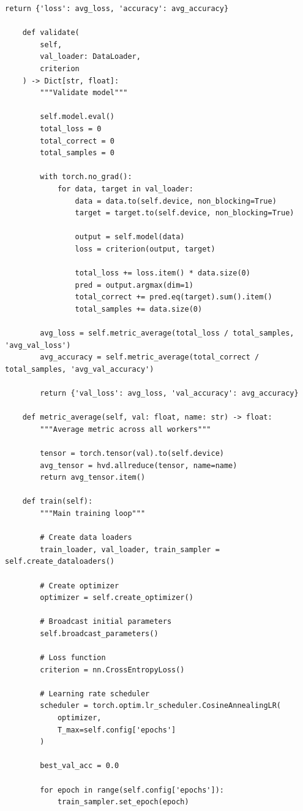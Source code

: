 \begin{lstlisting}[style=python, caption=Distributed Training with Horovod]
        return {'loss': avg_loss, 'accuracy': avg_accuracy}

    def validate(
        self,
        val_loader: DataLoader,
        criterion
    ) -> Dict[str, float]:
        """Validate model"""

        self.model.eval()
        total_loss = 0
        total_correct = 0
        total_samples = 0

        with torch.no_grad():
            for data, target in val_loader:
                data = data.to(self.device, non_blocking=True)
                target = target.to(self.device, non_blocking=True)

                output = self.model(data)
                loss = criterion(output, target)

                total_loss += loss.item() * data.size(0)
                pred = output.argmax(dim=1)
                total_correct += pred.eq(target).sum().item()
                total_samples += data.size(0)

        avg_loss = self.metric_average(total_loss / total_samples, 'avg_val_loss')
        avg_accuracy = self.metric_average(total_correct / total_samples, 'avg_val_accuracy')

        return {'val_loss': avg_loss, 'val_accuracy': avg_accuracy}

    def metric_average(self, val: float, name: str) -> float:
        """Average metric across all workers"""

        tensor = torch.tensor(val).to(self.device)
        avg_tensor = hvd.allreduce(tensor, name=name)
        return avg_tensor.item()

    def train(self):
        """Main training loop"""

        # Create data loaders
        train_loader, val_loader, train_sampler = self.create_dataloaders()

        # Create optimizer
        optimizer = self.create_optimizer()

        # Broadcast initial parameters
        self.broadcast_parameters()

        # Loss function
        criterion = nn.CrossEntropyLoss()

        # Learning rate scheduler
        scheduler = torch.optim.lr_scheduler.CosineAnnealingLR(
            optimizer,
            T_max=self.config['epochs']
        )

        best_val_acc = 0.0

        for epoch in range(self.config['epochs']):
            train_sampler.set_epoch(epoch)


\end{lstlisting}
